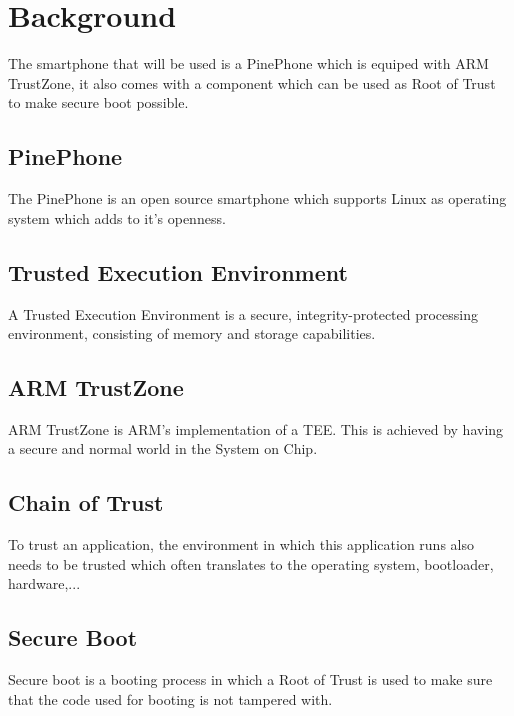 \documentclass{report}
\begin{document}
\chapter{Background}

The smartphone that will be used is a PinePhone which is equiped with ARM TrustZone, it also comes with a component which can be used as Root of Trust to make secure boot possible. 

\section{PinePhone}

The PinePhone is an open source smartphone which supports Linux as operating system which adds to it's openness.

\section{Trusted Execution Environment}

A Trusted Execution Environment is a secure, integrity-protected processing environment, consisting of memory and storage capabilities.

\section{ARM TrustZone}

ARM TrustZone is ARM's implementation of a TEE. This is achieved by having a secure and normal world in the System on Chip.

\section{Chain of Trust}

To trust an application, the environment in which this application runs also needs to be trusted which often translates to the operating system, bootloader, hardware,...

\section{Secure Boot}

Secure boot is a booting process in which a Root of Trust is used to make sure that the code used for booting is not tampered with.
\end{document}
